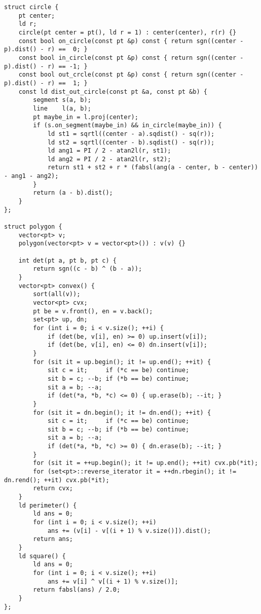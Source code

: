 \documentclass[a4paper,12pt]{report}
\begin{document}
\begin{lstlisting}
struct circle {
    pt center;
    ld r;
    circle(pt center = pt(), ld r = 1) : center(center), r(r) {}
    const bool on_circle(const pt &p) const { return sgn((center - p).dist() - r) ==  0; }
    const bool in_circle(const pt &p) const { return sgn((center - p).dist() - r) == -1; }
    const bool out_crcle(const pt &p) const { return sgn((center - p).dist() - r) ==  1; }
    const ld dist_out_circle(const pt &a, const pt &b) {
        segment s(a, b);
        line    l(a, b);
        pt maybe_in = l.proj(center);
        if (s.on_segment(maybe_in) && in_circle(maybe_in)) {
            ld st1 = sqrtl((center - a).sqdist() - sq(r));
            ld st2 = sqrtl((center - b).sqdist() - sq(r));
            ld ang1 = PI / 2 - atan2l(r, st1);
            ld ang2 = PI / 2 - atan2l(r, st2);
            return st1 + st2 + r * (fabsl(ang(a - center, b - center)) - ang1 - ang2);
        }
        return (a - b).dist();
    }
};

struct polygon {
    vector<pt> v;
    polygon(vector<pt> v = vector<pt>()) : v(v) {}

    int det(pt a, pt b, pt c) {
        return sgn((c - b) ^ (b - a));
    }
    vector<pt> convex() {
        sort(all(v));
        vector<pt> cvx;
        pt be = v.front(), en = v.back();
        set<pt> up, dn;
        for (int i = 0; i < v.size(); ++i) {
            if (det(be, v[i], en) >= 0) up.insert(v[i]);
            if (det(be, v[i], en) <= 0) dn.insert(v[i]);
        }
        for (sit it = up.begin(); it != up.end(); ++it) {
            sit c = it;     if (*c == be) continue;
            sit b = c; --b; if (*b == be) continue;
            sit a = b; --a;
            if (det(*a, *b, *c) <= 0) { up.erase(b); --it; }
        }
        for (sit it = dn.begin(); it != dn.end(); ++it) {
            sit c = it;     if (*c == be) continue;
            sit b = c; --b; if (*b == be) continue;
            sit a = b; --a;
            if (det(*a, *b, *c) >= 0) { dn.erase(b); --it; }
        }
        for (sit it = ++up.begin(); it != up.end(); ++it) cvx.pb(*it);
        for (set<pt>::reverse_iterator it = ++dn.rbegin(); it != dn.rend(); ++it) cvx.pb(*it);
        return cvx;
    }
    ld perimeter() {
        ld ans = 0;
        for (int i = 0; i < v.size(); ++i)
            ans += (v[i] - v[(i + 1) % v.size()]).dist();
        return ans;
    }
    ld square() {
        ld ans = 0;
        for (int i = 0; i < v.size(); ++i)
            ans += v[i] ^ v[(i + 1) % v.size()];
        return fabsl(ans) / 2.0;
    }
};


\end{lstlisting}
\end{document}
